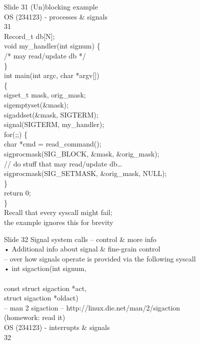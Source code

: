 \documentclass{beamer}
\begin{document}
\begin{frame}{Slide 31}
(Un)blocking example\\OS (234123) - processes \& signals\\31\\Record\_t db[N];\\void my\_handler(int signum) \{\\  /* may read/update db */\\\}\\int main(int argc, char *argv[]) \\\{\\  sigset\_t mask, orig\_mask;\\  sigemptyset(\&mask);\\  sigaddset(\&mask, SIGTERM); \\  signal(SIGTERM, my\_handler);\\  for(;;) \{\\    char *cmd = read\_command();\\    sigprocmask(SIG\_BLOCK, \&mask, \&orig\_mask);\\    // do stuff that may read/update db…\\    sigprocmask(SIG\_SETMASK, \&orig\_mask, NULL);\\  \}\\  return 0;\\\}\\Recall that every syscall might fail;\\the example ignores this for brevity
\end{frame}
\begin{frame}{Slide 32}
Signal system calls – control \& more info\\• Additional info about signal \& fine-grain control \\– over how signals operate is provided via the following syscall\\• int sigaction(int signum, \\ \\const struct sigaction *act, \\        struct sigaction *oldact)\\– man 2 sigaction – http://linux.die.net/man/2/sigaction \\(homework: read it)\\OS (234123) - interrupts \& signals\\32
\end{frame}
\end{document}
